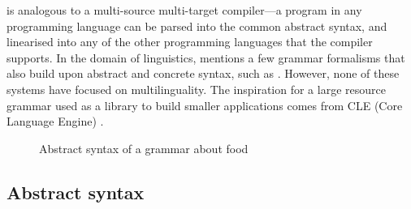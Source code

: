 \gf{} is analogous to a multi-source multi-target compiler---a program
in any programming language can be parsed into the common abstract
syntax, and linearised into any of the other programming languages
that the compiler supports.  In the domain of linguistics,
\citet{ranta2011gfbook} mentions a few grammar formalisms that also
build upon abstract and concrete syntax, such as
\citet{deGroote2001acg,pollard2004hog,muskens2001lambda}. However, none
of these systems have focused on multilinguality.
The inspiration for a large resource grammar used as a library to
build smaller applications comes from  CLE (Core Language Engine)
\cite{CLE,cle2}.


\begin{figure}[h]
\centering

\begin{Shaded}
\begin{Highlighting}[]
 \FunctionTok{=} \NormalTok{\{}
  \FunctionTok{=}  \NormalTok{;}
     \NormalTok{; } \NormalTok{; } \NormalTok{; } \NormalTok{;}
    \OtherTok{ :}  \OtherTok{->}  \OtherTok{->}  \NormalTok{;                 }
    \NormalTok{, }\NormalTok{, }\NormalTok{, }\OtherTok{ :}  \OtherTok{->}  \NormalTok{;           }
    \OtherTok{ :}  \OtherTok{->}  \OtherTok{->}  \NormalTok{;                     }
    \NormalTok{, }\NormalTok{, }\NormalTok{, }\OtherTok{ :}  \NormalTok{;}
    \NormalTok{, }\NormalTok{, }\NormalTok{, }\OtherTok{ :}  \NormalTok{;}
\end{Highlighting}
\end{Shaded}
  \caption{Abstract syntax of a \gf{} grammar about food}
\label{fig:foods}
\end{figure}

\subsection{Abstract syntax}


